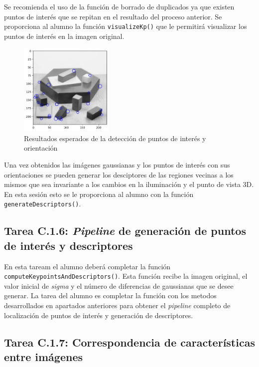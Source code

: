Se recomienda el uso de la función de borrado de duplicados ya que existen puntos de interés que se repitan en el resultado del proceso anterior. Se proporciona al alumno la función \texttt{visualizeKp()} que le permitirá visualizar los puntos de interés en la imagen original.

\begin{figure}[h]
    \centering
    \includegraphics[width=0.4\textwidth]{Lab_3/template/figures/KeypointDetect.png}
    \caption{Resultados esperados de la detección de puntos de interés y orientación}
    \label{fig:KPDet}
\end{figure}

Una vez obtenidos las imágenes gaussianas y los puntos de interés con sus orientaciones se pueden generar los desciptores de las regiones vecinas a los mismos que sea invariante a los cambios en la iluminación y el punto de vista 3D. En esta sesión esto se le proporciona al alumno con la función \texttt{generateDescriptors()}.

\subsection*{Tarea C.1.6: \textit{Pipeline} de generación de puntos de interés y descriptores}

En esta taream el alumno deberá completar la función \texttt{computeKeypointsAndDescriptors()}. Esta función recibe la imagen original, el valor inicial de \textit{sigma} y el número de diferencias de gaussianas que se desee generar. La tarea del alumno es completar la función con los metodos desarrollados en apartados anteriores para obtener el \textit{pipeline} completo de localización de puntos de interés y generación de descriptores.

\subsection*{Tarea C.1.7: Correspondencia de características entre imágenes}

